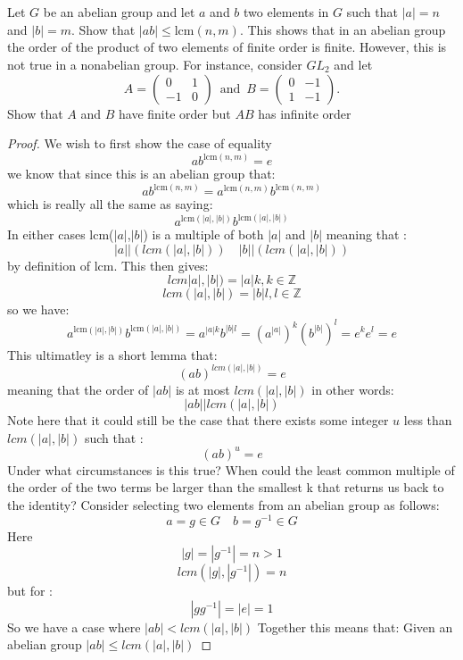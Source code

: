 \documentclass[11pt]{article}
\theoremstyle{definition}  %
\newcommand{\Z}{\mathbb{Z}}
\newcommand{\lcm}{\mathrm{lcm}}
\newcommand{\bigline}{\\\noindent\makebox[\linewidth]{\rule{\paperwidth}{0.4pt}}\\}
\begin{document}
\bigline
\begin{tcolorbox}[title=Question 5]
\item Let $G$ be an abelian group and let $a$ and $b$ two elements in $G$ such that $|a| = n$ and $|b| = m$. Show that $|ab| \leq \mathrm{lcm}(n,m)$.
  This shows that in an abelian group the order of the product of two elements of finite order is finite. However, this is not true in a nonabelian group.
  For instance, consider $GL_2$ and let
  $$ A = \left( \begin{array}{rc} 0 & 1 \\ -1 & 0 \end{array} \right) \,\,\, \mbox{and} \,\,\, B = \left( \begin{array}{cr} 0 & -1 \\ 1 & -1 \end{array} \right).$$
  Show that $A$ and $B$ have finite order but $AB$ has infinite order
\end{tcolorbox}
  \begin{proof}
    We wish to first show the case of equality
    \[
      ab^{\lcm(n,m)}=e
    \]
    we know that since this is an abelian group that:
    \[
      ab^{\lcm(n,m)}=a^{\lcm(n,m)}b^{\lcm(n,m)}
    \]
    which is really all the same as saying:
    \[
      a^{\lcm(|a|,|b|)}b^{\lcm(|a|,|b|)}
    \]
      In either cases lcm($|a|$,$|b|$) is a multiple of both $|a|$ and $|b|$ meaning that :
      \[
        |a||(lcm(|a|,|b|) )\quad |b||(lcm(|a|,|b|))
      \]
      by definition of lcm. This then gives:
      \[
        lcm|a|,|b|)=|a|k, k \in \Z
      \]
      \[
        lcm(|a|,|b|)=|b|l, l \in \Z
      \]
      so we have:
      \[
        a^{\lcm(|a|,|b|)}b^{\lcm(|a|,|b|)}=a^{|a|k}b^{|b|l}=(a^{|a|})^k(b^{|b|})^l=e^ke^l=e
      \]
      This ultimatley is a short lemma that:
      \[
        (ab)^{lcm(|a|,|b|)}=e
      \]
      meaning that the order of $|ab|$ is at most $lcm(|a|,|b|)$ in other words:
      \[
        |ab||lcm(|a|,|b|)
      \]
      Note here that it could still be the case that there exists some integer $u$ less than $lcm(|a|,|b|)$ such that :
      \[
        (ab)^u=e
      \]
      Under what circumstances is this true? When could the least common multiple of the order of the two terms be larger than the smallest k that returns us back to the identity?
      Consider selecting two elements from an abelian group as follows:
      \[
        a=g\in G \quad b=g^{-1}\in G
      \]
      Here
    \[
      |g|=|g^{-1}|=n>1
    \]
    \[
      lcm(|g|,|g^{-1}|)=n
    \]
    but for :
    \[
      |gg^{-1}|=|e|=1
    \]
    So we have a case where $|ab|<lcm(|a|,|b|)$
    Together this means that:
    Given an abelian group $|ab|\leq lcm(|a|,|b|)$
  \end{proof}
\end{document}
